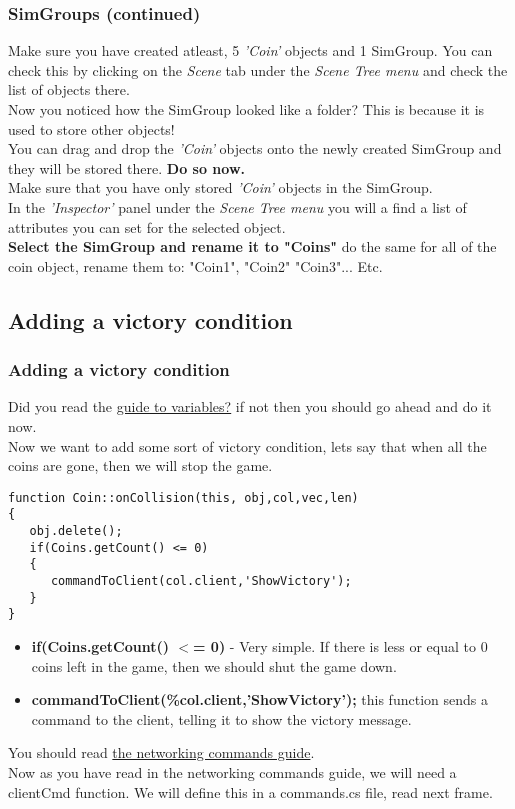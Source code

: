 \begin{frame}
\frametitle{SimGroups (continued)}
Make sure you have created atleast, 5 {\it 'Coin'} objects and 1 SimGroup. You can check this by clicking on the {\it Scene} tab under
the {\it Scene Tree menu} and check the list of objects there.\\
Now you noticed how the SimGroup looked like a folder? This is because it is used to store other objects!\\
You can drag and drop the {\it 'Coin'} objects onto the newly created SimGroup and they will be stored there.
{\bf Do so now.}\\
Make sure that you have only stored {\it 'Coin'} objects in the SimGroup.\\
In the {\it 'Inspector'} panel under the {\it Scene Tree menu} you will a find a list of attributes you can
set for the selected object.\\
{\bf Select the SimGroup and rename it to "Coins"} do the same for all of the coin object, rename them to:
"Coin1", "Coin2" "Coin3"... Etc.
\end{frame}

\subsection*{Adding a victory condition}
\begin{frame}[fragile]
\frametitle{Adding a victory condition}
Did you read the \hyperlink{QG-Variables}{guide to variables?} if not then you should go ahead and do it now.\\
Now we want to add some sort of victory condition, 
lets say that when all the coins are gone, then we will stop the game.
\TS
\begin{lstlisting}
function Coin::onCollision(this, obj,col,vec,len)
{
   obj.delete();
   if(Coins.getCount() <= 0)
   {
      commandToClient(col.client,'ShowVictory');
   }
}
\end{lstlisting}
\begin{itemize}
\item {\bf if(Coins.getCount() $<$= 0)} - Very simple. If there is less or equal to 0 coins left in the game,
then we should shut the game down.
\item {\bf commandToClient(\%col.client,'ShowVictory');} this function sends a command to the client, telling
it to show the victory message.
\end{itemize}
You should read {\color{blue}\hyperlink{QG-Networking}{the networking commands guide}}.\\
Now as you have read in the networking commands guide, we will need a clientCmd function. We will define this in a
commands.cs file, read next frame.
\end{frame}


